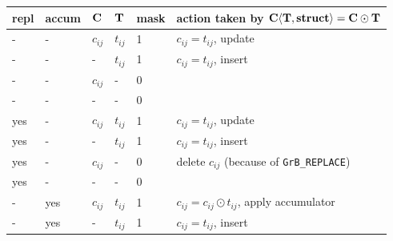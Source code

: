 \begin{table}
{\small
\begin{tabular}{lllll|l}
\hline
repl & accum & ${\bf C}$ & ${\bf T}$ & mask & action taken by ${\bf C \langle T, struct \rangle = C \odot T}$ \\
\hline
    -  &-   & $c_{ij}$ & $t_{ij}$  & 1    &  $c_{ij} = t_{ij}$, update \\
    -  &-   &  -       & $t_{ij}$  & 1    &  $c_{ij} = t_{ij}$, insert \\
    -  &-   & $c_{ij}$ &  -        & 0    &   \\
    -  &-   &  -       &  -        & 0    &   \\
\hline
    yes&-   & $c_{ij}$ & $t_{ij}$  & 1    &  $c_{ij} = t_{ij}$, update \\
    yes&-   &  -       & $t_{ij}$  & 1    &  $c_{ij} = t_{ij}$, insert \\
    yes&-   & $c_{ij}$ &  -        & 0    &  delete $c_{ij}$  (because of \verb'GrB_REPLACE') \\
    yes&-   &  -       &  -        & 0    &   \\
\hline
    -  &yes & $c_{ij}$ & $t_{ij}$  & 1    &  $c_{ij} = c_{ij} \odot t_{ij}$, apply accumulator \\
    -  &yes &  -       & $t_{ij}$  & 1    &  $c_{ij} = t_{ij}$, insert \\

\end{tabular}}
\end{table}
